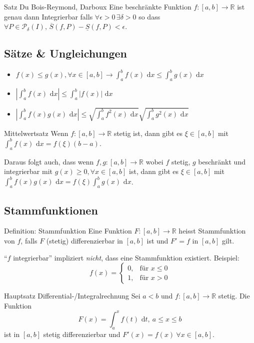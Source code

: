 \documentclass[a4paper,10pt]{article}
\def\R{\mathbb{R}}
\def\dx{\text{ d}x}
\begin{document}
\begin{mainbox}{Satz Du Bois-Reymond, Darboux}
  Eine beschränkte Funktion $f: [a,b] \to \R$ ist genau dann Integrierbar falls $\forall \epsilon > 0 \, \exists \delta > 0$ so dass\\
  $\forall P \in \mathcal{P}_\delta(I), \, \overline{S}(f,P) - \underline{S}(f, P) < \epsilon$.
\end{mainbox}

\subsection{Sätze \& Ungleichungen}
\begin{itemize}
 \item $f(x) \le g(x), \forall x \in [a,b] \rightarrow \int_a^b f(x) \dx \le \int_a^b g(x) \dx$
 \item $\left|\int_a^b f(x) \dx\right| \le \int_a^b |f(x)| \dx$
 \item $\left|\int_a^b f(x) g(x) \dx \right| \le \sqrt{\int_a^b f^2(x) \dx} \sqrt{\int_a^b g^2(x) \dx}$
\end{itemize}

\begin{mainbox}{Mittelwertsatz}
 Wenn $f: [a,b] \to \R$ stetig ist, dann gibt es $\xi \in [a,b]$ mit $\int_a^b f(x) \dx = f(\xi) (b-a)$.
\end{mainbox}
Daraus folgt auch, dass wenn $f,g: [a,b] \to \R$ wobei $f$ stetig, $g$ beschränkt und integrierbar mit $g(x) \ge 0, \forall x \in [a,b]$ ist, dann gibt es $\xi \in [a,b]$ mit $\int_a^b f(x)g(x) \dx = f(\xi) \int_a^b g(x) \dx$.

\subsection{Stammfunktionen}
\begin{subbox}{Definition: Stammfunktion}
 Eine Funktion $F: [a,b] \to \R$ heisst Stammfunktion von $f$, falls $F$ (stetig) differenzierbar in $[a,b]$ ist und $F' = f$ in $[a,b]$ gilt.
\end{subbox}
``$f$ integrierbar'' impliziert \textit{nicht}, dass eine Stammfunktion existiert. Beispiel:
$$
 f(x) = \begin{cases}
        0, & \text{für } x \le 0 \\
        1, & \text{für } x > 0
        \end{cases}
$$

\begin{mainbox}{Hauptsatz Differential-/Integralrechnung}
 Sei $a<b$ und $f: [a,b] \to \R$ stetig. Die Funktion 
 $$F(x) = \int_a^x f(t) \text{ d}t, \ a \le x \le b$$
 ist in $[a,b]$ stetig differenzierbar und $F'(x) = f(x) \ \forall x \in [a,b]$.
\end{mainbox}
\end{document}
